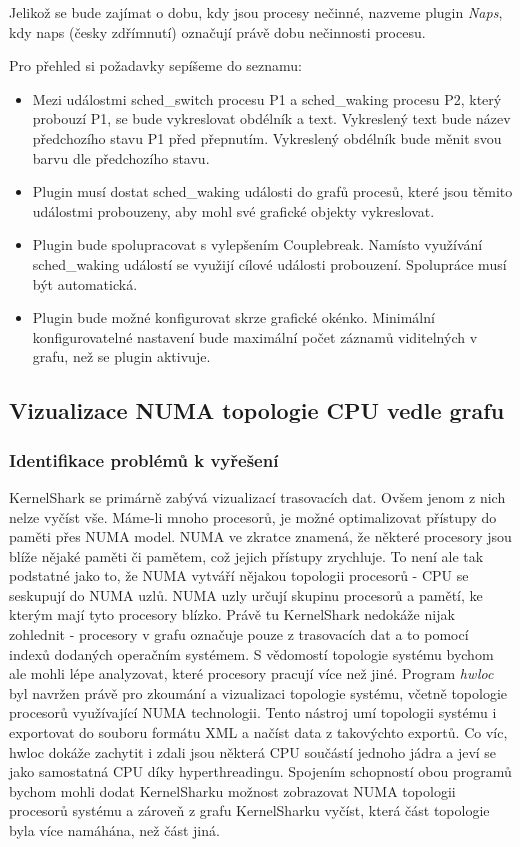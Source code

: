 Jelikož se bude zajímat o dobu, kdy jsou procesy nečinné, nazveme plugin \emph{Naps}, kdy naps (česky zdřímnutí) označují právě dobu nečinnosti procesu.

Pro přehled si požadavky sepíšeme do seznamu:
\begin{itemize}
    \item Mezi událostmi sched\_switch procesu P1 a sched\_waking procesu P2, který probouzí P1, se bude vykreslovat obdélník a text. Vykreslený text bude název předchozího stavu P1 před přepnutím. Vykreslený obdélník bude měnit svou barvu dle předchozího stavu.
    \item Plugin musí dostat sched\_waking události do grafů procesů, které jsou těmito událostmi probouzeny, aby mohl své grafické objekty vykreslovat.
    \item Plugin bude spolupracovat s vylepšením Couplebreak. Namísto využívání sched\_waking událostí se využijí cílové události probouzení. Spolupráce musí být automatická.
    \item Plugin bude možné konfigurovat skrze grafické okénko. Minimální konfigurovatelné nastavení bude maximální počet záznamů viditelných v grafu, než se plugin aktivuje. 
\end{itemize}

\subsection{Vizualizace NUMA topologie CPU vedle grafu}

\subsubsection*{Identifikace problémů k vyřešení}
KernelShark se primárně zabývá vizualizací trasovacích dat. Ovšem jenom z nich nelze vyčíst vše. Máme-li mnoho procesorů, je možné optimalizovat přístupy do paměti přes NUMA model. NUMA ve zkratce znamená, že některé procesory jsou blíže nějaké paměti či pamětem, což jejich přístupy zrychluje. To není ale tak podstatné jako to, že NUMA vytváří nějakou topologii procesorů - CPU se seskupují do NUMA uzlů. NUMA uzly určují skupinu procesorů a pamětí, ke kterým mají tyto procesory blízko. Právě tu KernelShark nedokáže nijak zohlednit - procesory v grafu označuje pouze z trasovacích dat a to pomocí indexů dodaných operačním systémem. S vědomostí topologie systému bychom ale mohli lépe analyzovat, které procesory pracují více než jiné. Program \emph{hwloc} byl navržen právě pro zkoumání a vizualizaci topologie systému, včetně topologie procesorů využívající NUMA technologii. Tento nástroj umí topologii systému i exportovat do souboru formátu XML a načíst data z takovýchto exportů. Co víc, hwloc dokáže zachytit i zdali jsou některá CPU součástí jednoho jádra a jeví se jako samostatná CPU díky hyperthreadingu. Spojením schopností obou programů bychom mohli dodat KernelSharku možnost zobrazovat NUMA topologii procesorů systému a zároveň z grafu KernelSharku vyčíst, která část topologie byla více namáhána, než část jiná.  

